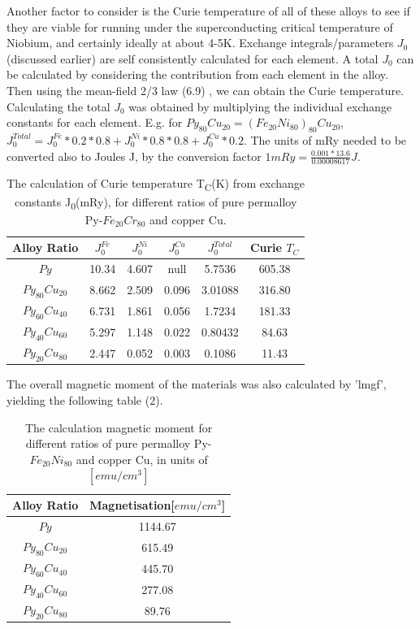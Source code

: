 \documentclass[12pt]{article}
\begin{document}
Another factor to consider is the Curie temperature of all of these alloys to see if they are viable for running under the superconducting critical temperature of Niobium, and certainly ideally at about 4-5K. Exchange integrals/parameters $J_0$ (discussed earlier) are self consistently calculated for each element. A total $J_0$ can be calculated by considering the contribution from each element in the alloy. Then using the mean-field 2/3 law (6.9) , we can obtain the Curie temperature. Calculating the total $J_0$ was obtained by multiplying the individual exchange constants for each element. E.g. for $Py_{80}Cu_{20}=(Fe_{20}Ni_{80})_{80}Cu_{20}$, $J_0^{Total}=J_0^{Fe}*0.2*0.8+J_0^{Ni}*0.8*0.8+J_0^{Cu}*0.2$. The units of mRy needed to be converted also to Joules J, by the conversion factor $1mRy=\frac{0.001*13.6}{0.00008617}J$.
\begin{table}[h!]
\centering
 \begin{tabular}{||c c c c c c||} 
 \hline
 Alloy Ratio & $J_0^{Fe}$ & $J_0^{Ni}$ & $J_0^{Cu}$ & $J_0^{Total}$ & Curie $T_C$ \\ [1ex] 
 \hline\hline
 $Py$ & 10.34 & 4.607 & null & 5.7536 & 605.38 \\ 
 $Py_{80}Cu_{20}$ & 8.662 & 2.509 & 0.096 & 3.01088 & 316.80 \\
 $Py_{60}Cu_{40}$ & 6.731 & 1.861 & 0.056 & 1.7234 & 181.33 \\
 $Py_{40}Cu_{60}$ & 5.297 & 1.148 & 0.022 & 0.80432 & 84.63 \\
 $Py_{20}Cu_{80}$ & 2.447 & 0.052 & 0.003 & 0.1086 & 11.43 \\ [1ex] 
 \hline
 \end{tabular}
\caption{The calculation of Curie temperature T\textsubscript{C}(K) from exchange constants J\textsubscript{0}(mRy), for different ratios of pure permalloy Py-$Fe_{20}Cr_{80}$ and copper Cu.} 
\end{table}

The overall magnetic moment of the materials was also calculated by 'lmgf', yielding the following table (2).

\begin{table}[h!]
\centering
 \begin{tabular}{||c c||} 
 \hline
 Alloy Ratio & Magnetisation[$emu/cm^3$] \\ [1ex] 
 \hline\hline
 $Py$ & 1144.67 \\ 
 $Py_{80}Cu_{20}$ & 615.49 \\
 $Py_{60}Cu_{40}$ & 445.70 \\
 $Py_{40}Cu_{60}$ & 277.08 \\
 $Py_{20}Cu_{80}$ & 89.76 \\ [1ex] 
 \hline
 \end{tabular}
\caption{The calculation magnetic moment for different ratios of pure permalloy Py-$Fe_{20}Ni_{80}$ and copper Cu, in units of $[emu/cm^3]$} 
\end{table}
\end{document}
